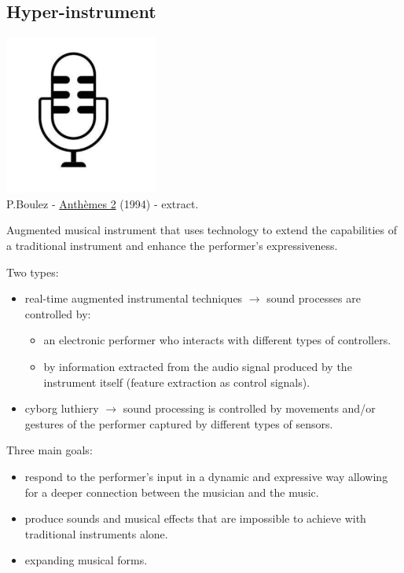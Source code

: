 \subsection{Hyper-instrument}\label{hyper-instrument}

\begin{center}
\includegraphics[scale=0.6]{../img/lel.png}\\
P.Boulez - \href{http://www.musicaecodice.it/gitmedia/emc/2_media/boulez1.mp4}{Anthèmes 2} (1994) - extract.
\end{center}

Augmented musical instrument that uses technology to extend the capabilities of a traditional instrument and enhance the performer's expressiveness.

Two types:

\begin{itemize}
\tightlist
\item real-time augmented instrumental techniques \(\rightarrow\) sound processes are controlled by:

  \begin{itemize}
  \tightlist
  \item an electronic performer who interacts with different types of controllers.
  \item by information extracted from the audio signal produced by the instrument itself (feature extraction as control signals).
  \end{itemize}
\item cyborg luthiery \(\rightarrow\) sound processing is controlled by movements and/or gestures of the performer captured by different types of sensors.
\end{itemize}

Three main goals:

\begin{itemize}
\tightlist
\item respond to the performer's input in a dynamic and expressive way allowing for a deeper connection between the musician and the music.
\item produce sounds and musical effects that are impossible to achieve with traditional instruments alone.
\item expanding musical forms.
\end{itemize}

